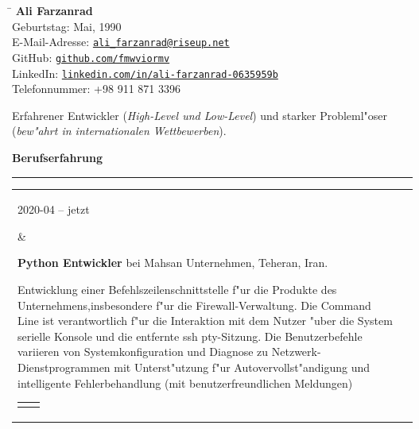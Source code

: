 \documentclass[11pt,a4paper,oneside]{article}
\makeatletter
\newcommand{\https}[1]{\href{https://#1}{\nolinkurl{#1}}}
\newcommand{\mailto}[1]{\href{mailto://#1}{\nolinkurl{#1}}}
\newcommand{\prog}{Programmiersprache:}
\newcommand{\os}{Betriebssystem:}
\newcommand{\vcs}{Versionskontrollen:}
\newcommand{\issue}{Problemverfolgung:}
\renewcommand{\section}[1]{%
{\large\textbf{#1}}\\
\rule[9pt]{18cm}{.4pt}\vspace{-16pt}%
}
\newenvironment{mytable}{%
\begin{tabular}{@{}l@{\hspace{4mm}}l@{}}%
}{\end{tabular}}
\newcommand{\myitem}[2]{%
\parbox[t]{16mm}{#1}&\parbox[t]{16cm}{#2}\\%
}
\newenvironment{innertable}{%
\begin{tabular}{@{}l@{\hspace{5mm}}l@{}}%
}{\end{tabular}}
\newcommand{\inneritem}[2]{%
\parbox{35mm}{{\color{darkgray}#1}}&\parbox{12cm}{#2}\\%
}
\makeatother
\begin{document}
%
%
\hspace{1cm}%
\parbox{13cm}{%
\begin{tabbing}%
\hspace{3cm}\=\kill%
\textbf{{\LARGE Ali Farzanrad}}\\[5mm]
Geburtstag:  Mai, 1990\\[1mm]
E-Mail-Adresse: \>
\mailto{ali_farzanrad@riseup.net}\\[1mm]
GitHub: \>
\https{github.com/fmwviormv}\\[1mm]
LinkedIn: \>
\https{linkedin.com/in/ali-farzanrad-0635959b}\\[1mm]
Telefonnummer: \>
{+}98{ }911{ }871{ }3396\\
\end{tabbing}%
}

\vspace{-9pt}%
Erfahrener Entwickler (\textit{High-Level und Low-Level}) und starker
Probleml"oser (\textit{bew"ahrt in internationalen Wettbewerben}).

\section{Berufserfahrung}

\begin{mytable}
\myitem{2020-04 -- jetzt}{%
\textbf{Python Entwickler} bei
Mahsan Unternehmen, Teheran, Iran.

Entwicklung einer Befehlszeilenschnittstelle f"ur die Produkte
des Unternehmens,insbesondere f"ur die Firewall-Verwaltung.
Die Command Line ist verantwortlich f"ur die Interaktion mit dem Nutzer
"uber die System serielle Konsole und die entfernte ssh pty-Sitzung.
Die Benutzerbefehle variieren von Systemkonfiguration und Diagnose
zu Netzwerk-Dienstprogrammen mit Unterst"utzung
f"ur Autovervollst"andigung und intelligente Fehlerbehandlung
(mit benutzerfreundlichen Meldungen)

\begin{innertable}
\inneritem{\prog}{Python 3, und Shellskript}
\inneritem{\os}{Ubuntu}
\inneritem{\vcs}{Git}
\inneritem{\issue}{Gitlab}
\end{innertable}
}
\end{mytable}
\end{document}

